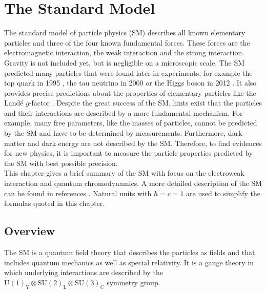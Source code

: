 \chapter{The Standard Model}
\label{ch:theory}

The standard model of particle physics (SM) describes all known elementary particles and three of the four known fundamental forces. These forces are the electromagnetic interaction, the weak interaction and the strong interaction. Gravity is not included yet, but is negligible on a microscopic scale. The SM predicted many particles that were found later in experiments, for example the top quark in 1995 \cite{tdiscovery}, the tau neutrino in 2000 \cite{tau2000} or the Higgs boson in 2012 \cite{ATLAS_higgs_1207, CMS_higgs_1207}. It also provides precise predictions about the properties of elementary particles like the Landé $g$-factor \cite{Lande}. Despite the great success of the SM, hints exist that the particles and their interactions are described by a more fundamental mechanism. For example, many free parameters, like the masses of particles, cannot be predicted by the SM and have to be determined by measurements. Furthermore, dark matter and dark energy are not described by the SM. Therefore, to find evidences for new physics, it is important to measure the particle properties predicted by the SM with best possible precision. \\

This chapter gives a brief summary of the SM with focus on the electroweak interaction and quantum chromodynamics. A more detailed description of the SM can be found in references \cite{QuarksAndLeptons, Gordon, PhysicsFromSymmetry, Peskin}. Natural units with $\hbar = c = 1$ are used to simplify the formulas quoted in this chapter. 


\section{Overview}

The SM is a quantum field theory that describes the particles as fields and that includes quantum mechanics as well as special relativity. It is a gauge theory in which underlying interactions are described by the $\textrm{U}(1)_\textrm{Y}\otimes \textrm{SU}(2)_\textrm{L}\otimes \textrm{SU}(3)_\textrm{C}$ symmetry group. \\

